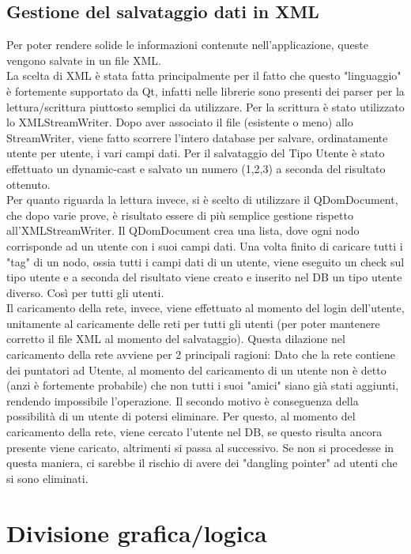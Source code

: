 \documentclass[openany, a4paper,11pt] {report}
\begin{document}
\section{Gestione del salvataggio dati in XML}
Per poter rendere solide le informazioni contenute nell'applicazione, queste vengono salvate in un file XML.\\
La scelta di XML è stata fatta principalmente per il fatto che questo "linguaggio" è fortemente supportato da Qt, infatti nelle librerie sono presenti dei parser per la lettura/scrittura piuttosto semplici da utilizzare.
Per la scrittura è stato utilizzato lo \textsf{XMLStreamWriter}. Dopo aver associato il file (esistente o meno) allo StreamWriter, viene fatto scorrere l'intero database per salvare, ordinatamente utente per utente, i vari campi dati. Per il salvataggio del \textsf{Tipo Utente} è stato effettuato un \textsf{dynamic-cast} e salvato un numero (1,2,3) a seconda del risultato ottenuto.\\
Per quanto riguarda la lettura invece, si è scelto di utilizzare il QDomDocument, che dopo varie prove, è risultato essere di più semplice gestione rispetto all'XMLStreamWriter. Il QDomDocument crea una lista, dove ogni nodo corrisponde ad un utente con i suoi campi dati. Una volta finito di caricare tutti i "tag" di un nodo, ossia tutti i campi dati di un utente, viene eseguito un check sul tipo utente e a seconda del risultato viene creato e inserito nel DB un tipo utente diverso. Così per tutti gli utenti.\\
Il caricamento della rete, invece, viene effettuato al momento del login dell'utente, unitamente al caricamente delle reti per tutti gli utenti (per poter mantenere corretto il file XML al momento del salvataggio). Questa dilazione nel caricamento della rete avviene per 2 principali ragioni: Dato che la rete contiene dei puntatori ad Utente, al momento del caricamento di un utente non è detto (anzi è fortemente probabile) che non tutti i suoi "amici" siano già stati aggiunti, rendendo impossibile l'operazione. Il secondo motivo è conseguenza della possibilità di un utente di potersi eliminare. Per questo, al momento del caricamento della rete, viene cercato l'utente nel DB, se questo risulta ancora presente viene caricato, altrimenti si passa al successivo. Se non si procedesse in questa maniera, ci sarebbe il rischio di avere dei "dangling pointer" ad utenti che si sono eliminati.

\chapter{Divisione grafica/logica}
\end{document}
